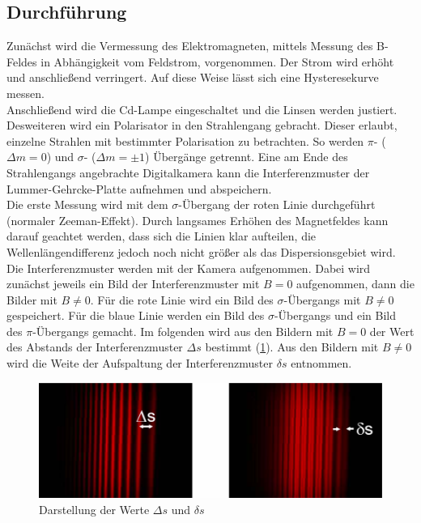 \subsection{Durchführung}
Zunächst wird die Vermessung des Elektromagneten, mittels Messung des B-Feldes in Abhängigkeit vom Feldstrom, vorgenommen.
Der Strom wird erhöht und anschließend verringert.
Auf diese Weise lässt sich eine Hysteresekurve messen.\\
Anschließend wird die Cd-Lampe eingeschaltet und die Linsen werden justiert.
Desweiteren wird ein Polarisator in den Strahlengang gebracht.
Dieser erlaubt, einzelne Strahlen mit bestimmter Polarisation zu betrachten.
So werden $\pi$- ($\Delta m = 0$) und $\sigma$- ($\Delta m = \pm 1$) Übergänge getrennt.
Eine am Ende des Strahlengangs angebrachte Digitalkamera kann die Interferenzmuster der Lummer-Gehrcke-Platte aufnehmen und abspeichern.\\
%
Die erste Messung wird mit dem $\sigma$-Übergang der roten Linie durchgeführt (normaler Zeeman-Effekt).
Durch langsames Erhöhen des Magnetfeldes kann darauf geachtet werden, dass sich die Linien klar aufteilen, die Wellenlängendifferenz jedoch noch nicht größer als das Dispersionsgebiet wird.
Die Interferenzmuster werden mit der Kamera aufgenommen.
Dabei wird zunächst jeweils ein Bild der Interferenzmuster mit $B=0$ aufgenommen, dann die Bilder mit $B≠0$.
Für die rote Linie wird ein Bild des $\sigma$-Übergangs mit $B≠0$ gespeichert.
Für die blaue Linie werden ein Bild des $\sigma$-Übergangs und ein Bild des $\pi$-Übergangs gemacht.
Im folgenden wird aus den Bildern mit $B=0$ der Wert des Abstands der Interferenzmuster $\Delta s$ bestimmt (\ref{fig:auslesen}).
Aus den Bildern mit $B≠0$ wird die Weite der Aufspaltung der Interferenzmuster $\delta s$ entnommen.
\begin{figure}[h!]
  \centering
  \includegraphics[width=\textwidth]{auslesen.png}
  \caption{Darstellung der Werte $\Delta s$ und $\delta s$ \cite{1}}
  \label{fig:auslesen}
\end{figure}

\FloatBarrier
